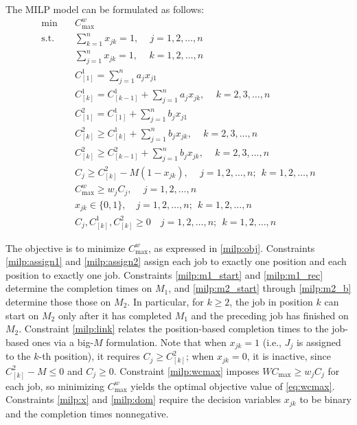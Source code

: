 \documentclass[12pt]{article}
\begin{document}
\begin{sloppypar}
        The MILP model can be formulated as follows:
        \begin{align}
            \min \quad & C_{\max}^w \label{milp:obj} \\
            \text{s.t.} \quad & \sum_{k=1}^{n} x_{jk} = 1, \quad \, j = 1, 2,\dots, n \label{milp:assign1} \\
            & \sum_{j=1}^{n} x_{jk} = 1, \quad \, k = 1, 2, \ldots,n \label{milp:assign2} \\
            & C_{[1]}^1 = \sum_{j=1}^{n} a_j x_{j1} \label{milp:m1_start} \\
            & C_{[k]}^1 = C_{[k-1]}^1 + \sum_{j=1}^{n} a_j x_{jk}, \quad \, k = 2, 3, \ldots, n \label{milp:m1_rec} \\
            & C_{[1]}^2 = C_{[1]}^1 + \sum_{j=1}^{n} b_j x_{j1} \label{milp:m2_start} \\
            & C_{[k]}^2 \geq C_{[k]}^1 + \sum_{j=1}^{n} b_j x_{jk}, \quad \, k = 2, 3, \ldots, n \label{milp:m2_a} \\
            & C_{[k]}^2 \geq C_{[k-1]}^2 + \sum_{j=1}^{n} b_j x_{jk}, \quad \, k = 2, 3, \ldots, n \label{milp:m2_b} \\
            & C_j \geq C_{[k]}^2 - M(1 - x_{jk}), \quad \, j = 1, 2, \ldots, n; ~~ k = 1, 2, \ldots, n \label{milp:link} \\
            & C_{\max}^w \geq w_j C_j, \quad \, j = 1, 2, \ldots,n \label{milp:wcmax} \\
            & x_{jk} \in \{0, 1\},\quad j=1, 2, \ldots, n; ~~ k=1, 2, \ldots, n \label{milp:x}\\
            & C_j, C_{[k]}^1, C_{[k]}^2 \geq 0 \quad j=1, 2, \ldots, n; ~~ k=1, 2, \ldots, n \label{milp:dom}
        \end{align}
        
        The objective is to minimize $C_{\max}^w$, as expressed in \cref{milp:obj}. Constraints \cref{milp:assign1} and \cref{milp:assign2} assign each job to exactly one position and each position to exactly one job. Constraints \cref{milp:m1_start} and \cref{milp:m1_rec} determine the completion times on $M_1$, and \cref{milp:m2_start} through \cref{milp:m2_b} determine those those on $M_2$. In particular, for $k \geq 2$, the job in position $k$ can start on $M_2$ only after it has completed $M_1$ and the preceding job has finished on $M_2$. Constraint \cref{milp:link} relates the position-based completion times to the job-based ones via a big-$M$ formulation. Note that when $x_{jk} = 1$ (i.e., $J_j$ is assigned to the $k$-th position), it requires $C_j \geq C_{[k]}^2$; when $x_{jk} = 0$, it is inactive, since $C_{[k]}^2 - M \leq 0$ and $C_j \geq 0$. Constraint \cref{milp:wcmax} imposes  $W C_{\max} \geq w_j C_j$ for each job, so minimizing $C_{\max}^w$ yields the optimal objective value of \cref{eq:wcmax}. Constraints \cref{milp:x} and \cref{milp:dom} require the decision variables $x_{jk}$ to be binary and the completion times nonnegative.
        

\end{sloppypar}
\end{document}
